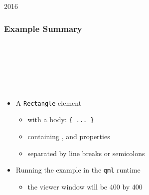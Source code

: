 \begin{slide}{2016}\frametitle{Example Summary}

\begin{qml}
\\
\vspace*{0.5em}
\\
\vspace*{0.5em}
\\
\\
\\
\qtt{\}}
\end{qml}

\vspace*{1em}
\begin{itemize}
\item A \texttt{\textcolor{class}{Rectangle}} element
  \begin{itemize}
  \item with a body: \texttt{\{ ... \}}
  \item containing ,  and 
  properties
  \item separated by line breaks or semicolons
  \end{itemize}
\item Running the example in the \texttt{qml} runtime
  \begin{itemize}
  \item the viewer window will be 400 by 400
  \end{itemize}
\end{itemize}

\end{slide}


